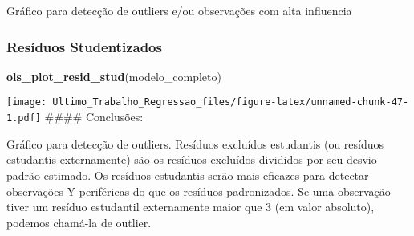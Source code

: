 \documentclass[
]{article}
\newenvironment{Shaded}{\begin{snugshade}}{\end{snugshade}}
\newcommand{\FunctionTok}[1]{\textcolor[rgb]{0.13,0.29,0.53}{\textbf{#1}}}
\newcommand{\NormalTok}[1]{#1}
\begin{document}
Gráfico para detecção de outliers e/ou observações com alta influencia

\hypertarget{resuxedduos-studentizados}{%
\subsubsection{Resíduos Studentizados}\label{resuxedduos-studentizados}}

\begin{Shaded}
\begin{Highlighting}[]
\FunctionTok{ols\_plot\_resid\_stud}\NormalTok{(modelo\_completo)}
\end{Highlighting}
\end{Shaded}

\texttt{[image: Ultimo\_Trabalho\_Regressao\_files/figure-latex/unnamed-chunk-47-1.pdf]}
\#\#\#\# Conclusões:

Gráfico para detecção de outliers. Resíduos excluídos estudantis (ou
resíduos estudantis externamente) são os resíduos excluídos divididos
por seu desvio padrão estimado. Os resíduos estudantis serão mais
eficazes para detectar observações Y periféricas do que os resíduos
padronizados. Se uma observação tiver um resíduo estudantil externamente
maior que 3 (em valor absoluto), podemos chamá-la de outlier.
\end{document}
